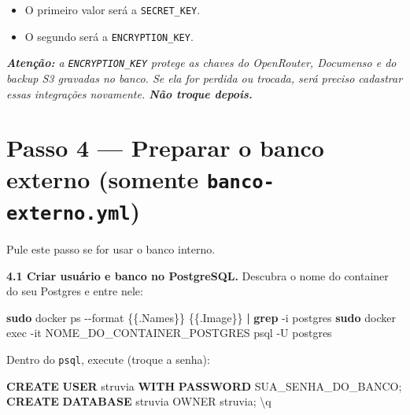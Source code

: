 \documentclass[
  10pt,
]{article}
\newenvironment{Shaded}{\begin{snugshade}}{\end{snugshade}}
\newcommand{\AttributeTok}[1]{\textcolor[rgb]{0.13,0.29,0.53}{#1}}
\newcommand{\FunctionTok}[1]{\textcolor[rgb]{0.13,0.29,0.53}{\textbf{#1}}}
\newcommand{\KeywordTok}[1]{\textcolor[rgb]{0.13,0.29,0.53}{\textbf{#1}}}
\newcommand{\NormalTok}[1]{#1}
\newcommand{\StringTok}[1]{\textcolor[rgb]{0.31,0.60,0.02}{#1}}
\providecommand{\tightlist}{%
  \setlength{\itemsep}{0pt}\setlength{\parskip}{0pt}}
\renewenvironment{quote}{\begin{oldquote}\small\itshape}{\end{oldquote}}
\begin{document}
\begin{itemize}
\tightlist
\item
  O primeiro valor será a \texttt{SECRET\_KEY}.
\item
  O segundo será a \texttt{ENCRYPTION\_KEY}.
\end{itemize}

\begin{quote}
\textbf{Atenção:} a \texttt{ENCRYPTION\_KEY} protege as chaves do
OpenRouter, Documenso e do backup S3 gravadas no banco. Se ela for
perdida ou trocada, será preciso cadastrar essas integrações novamente.
\textbf{Não troque depois.}
\end{quote}

\hypertarget{passo-4-preparar-o-banco-externo-somente-banco-externo.yml}{%
\section{\texorpdfstring{Passo 4 --- Preparar o banco externo (somente
\texttt{banco-externo.yml})}{Passo 4 --- Preparar o banco externo (somente banco-externo.yml)}}\label{passo-4-preparar-o-banco-externo-somente-banco-externo.yml}}

Pule este passo se for usar o banco interno.

\textbf{4.1 Criar usuário e banco no PostgreSQL.} Descubra o nome do
container do seu Postgres e entre nele:

\begin{Shaded}
\begin{Highlighting}[]
\FunctionTok{sudo}\NormalTok{ docker ps }\AttributeTok{{-}{-}format} \StringTok{\textquotesingle{}\{\{.Names\}\}  \{\{.Image\}\}\textquotesingle{}} \KeywordTok{|} \FunctionTok{grep} \AttributeTok{{-}i}\NormalTok{ postgres}
\FunctionTok{sudo}\NormalTok{ docker exec }\AttributeTok{{-}it}\NormalTok{ NOME\_DO\_CONTAINER\_POSTGRES psql }\AttributeTok{{-}U}\NormalTok{ postgres}
\end{Highlighting}
\end{Shaded}

Dentro do \texttt{psql}, execute (troque a senha):

\begin{Shaded}
\begin{Highlighting}[]
\KeywordTok{CREATE} \FunctionTok{USER}\NormalTok{ struvia }\KeywordTok{WITH} \KeywordTok{PASSWORD} \StringTok{\textquotesingle{}SUA\_SENHA\_DO\_BANCO\textquotesingle{}}\NormalTok{;}
\KeywordTok{CREATE} \KeywordTok{DATABASE}\NormalTok{ struvia OWNER struvia;}
\NormalTok{\textbackslash{}q}
\end{Highlighting}
\end{Shaded}
\end{document}
